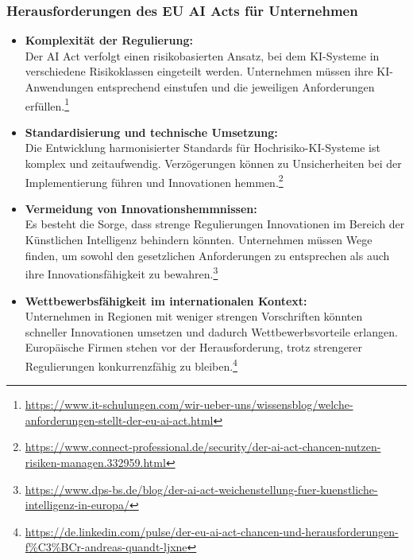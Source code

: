 \documentclass[aspectratio=1610, xcolor=dvipsnames, 9pt]{beamer}
\begin{document}
\begin{frame}
    \frametitle{Herausforderungen des EU AI Acts für Unternehmen}

    \begin{itemize}
        \item \textbf{Komplexität der Regulierung:} \\
        Der AI Act verfolgt einen risikobasierten Ansatz, bei dem KI-Systeme in verschiedene Risikoklassen eingeteilt werden. Unternehmen müssen ihre KI-Anwendungen entsprechend einstufen und die jeweiligen Anforderungen erfüllen.\footnote{\url{https://www.it-schulungen.com/wir-ueber-uns/wissensblog/welche-anforderungen-stellt-der-eu-ai-act.html}}

        \item \textbf{Standardisierung und technische Umsetzung:} \\
        Die Entwicklung harmonisierter Standards für Hochrisiko-KI-Systeme ist komplex und zeitaufwendig. Verzögerungen können zu Unsicherheiten bei der Implementierung führen und Innovationen hemmen.\footnote{\url{https://www.connect-professional.de/security/der-ai-act-chancen-nutzen-risiken-managen.332959.html}}

        \item \textbf{Vermeidung von Innovationshemmnissen:} \\
        Es besteht die Sorge, dass strenge Regulierungen Innovationen im Bereich der Künstlichen Intelligenz behindern könnten. Unternehmen müssen Wege finden, um sowohl den gesetzlichen Anforderungen zu entsprechen als auch ihre Innovationsfähigkeit zu bewahren.\footnote{\url{https://www.dps-bs.de/blog/der-ai-act-weichenstellung-fuer-kuenstliche-intelligenz-in-europa/}}

        \item \textbf{Wettbewerbsfähigkeit im internationalen Kontext:} \\
        Unternehmen in Regionen mit weniger strengen Vorschriften könnten schneller Innovationen umsetzen und dadurch Wettbewerbsvorteile erlangen. Europäische Firmen stehen vor der Herausforderung, trotz strengerer Regulierungen konkurrenzfähig zu bleiben.\footnote{\url{https://de.linkedin.com/pulse/der-eu-ai-act-chancen-und-herausforderungen-f\%C3\%BCr-andreas-quandt-ljxne}}
    \end{itemize}

\end{frame}
\end{document}
